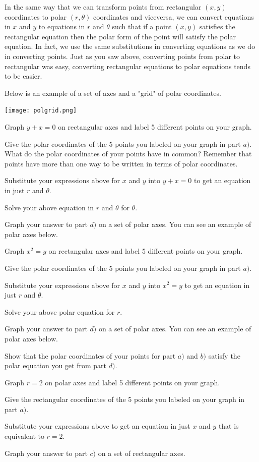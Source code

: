 In the same way that we can transform points from rectangular $(x,y)$ coordinates to polar $(r,\theta)$ coordinates and viceversa, we can convert equations in $x$ and $y$ to equations in $r$ and $\theta$ such that if a point $(x,y)$ satisfies the rectangular equation then the polar form of the point will satisfy the polar equation. In fact, we use the same substitutions in converting equations as we do in converting points. Just as you saw above, converting points from polar to rectangular was easy, converting rectangular equations to polar equations tends to be easier.

Below is an example of a set of axes and a "grid" of polar coordinates.
\begin{center} \texttt{[image: polgrid.png]} \end{center}

\bq \be
\item Graph $y+x=0$ on rectangular axes and label 5 different points on your graph.
\item Give the polar coordinates of the 5 points you labeled on your graph in part $a)$. What do the polar coordinates of your points have in common? Remember that points have more than one way to be written in terms of polar coordinates.
\item Substitute your expressions above for $x$ and $y$ into $y+x=0$ to get an equation in just $r$ and $\theta$.
\item Solve your above equation in $r$ and $\theta$ for $\theta$.
\item Graph your answer to part $d)$ on a set of polar axes. You can see an example of polar axes below.
\ee
\eq

\bq
\be
\item Graph $x^2=y$ on rectangular axes and label 5 different points on your graph.
\item Give the polar coordinates of the 5 points you labeled on your graph in part $a)$.
\item Substitute your expressions above for $x$ and $y$ into $x^2=y$ to get an equation in just $r$ and $\theta$.
\item Solve your above polar equation for $r$.
\item Graph your answer to part $d)$ on a set of polar axes. You can see an example of polar axes below.
\item Show that the polar coordinates of your points for part $a)$ and $b)$ satisfy the polar equation you get from part $d)$.
\ee
\eq

\bq \be
\item Graph $r=2$ on polar axes and label 5 different points on your graph.
\item Give the rectangular coordinates of the 5 points you labeled on your graph in part $a)$.
\item Substitute your expressions above to get an equation in just $x$ and $y$ that is equivalent to $r=2$.
\item Graph your answer to part $c)$ on a set of rectangular axes.
\ee
\eq

